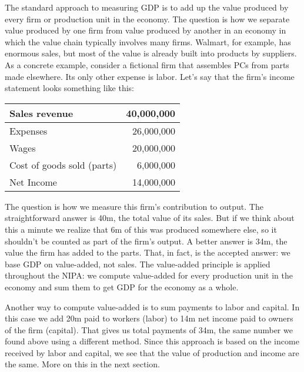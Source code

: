 \documentclass[12pt,letterpaper]{article}
\begin{document}
The standard approach to measuring GDP is to add up the value
produced by every firm or production unit in the economy. The
question is how we separate value produced by one firm from value
produced by another in an economy in which the value chain
typically involves many firms. Walmart, for example, has enormous
sales, but most of the value is already
built into products by suppliers. As a concrete example, consider
a fictional firm that assembles PCs from parts made elsewhere. Its
only other expense is labor. Let's say that the firm's income
statement looks something like this:
%
\begin{center}
\begin{tabular}{lr}
           Sales revenue    &  40,000,000      \\
\hline %
           Expenses         &  26,000,000      \\
  \hspace{0.25in} Wages       &  20,000,000      \\
  \hspace{0.25in} Cost of goods sold (parts)   &   6,000,000      \\
\hline %
           Net Income       &   14,000,000
\end{tabular}
\end{center}
%
The question is how we measure this firm's contribution to output.
The straightforward answer is 40m, the total value of its sales.
But if we think about this a minute we realize that 6m of this was
produced somewhere else, so it shouldn't be counted as part of the
firm's output. A better answer is 34m, the value the firm has
added to the parts. That, in fact, is the accepted answer: we base
GDP on value-added, not sales. The value-added principle is
applied throughout the NIPA: we compute value-added for every
production unit in the economy and sum them to get GDP for the
economy as a whole.


Another way to compute value-added is to sum payments to labor and
capital. In this case we add 20m paid to workers (labor) to 14m
net income paid to owners of the firm  (capital). That gives us
total payments of 34m, the same number we found above using a
different method.
Since this approach is based on the income received by labor and capital,
we see that the value of production and income are the same.
More on this in the next section.
\end{document}
